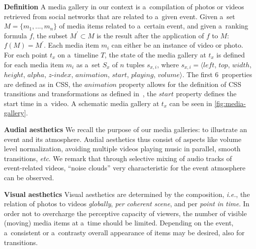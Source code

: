 \noindent \textbf{Definition}
A media gallery in our context is a~compilation of photos or videos
retrieved from social networks that are related to a~given event.
Given a~set $M = \{m_1,..., m_n\}$ of media items related to a~certain event,
and given a~ranking formula $f$,
the subset $M^\prime \subset M$
is the result after the application of $f$ to $M$: $f(M)=M^\prime$.
Each media item $m_i$ can either be an instance of video or photo.
For each point $t_x$ on a~timeline $T$, the state of the media gallery
at $t_x$ is defined for each media item $m_i$
as a~set $S_x$ of $n$ tuples $s_{x,i}$, where
$s_{x,i}=\langle \mathit{left}$, $\mathit{top}$, $\mathit{width}$, $\mathit{height}$,
$\mathit{alpha}$, $\mathit{z\mbox{-}index}$, $\mathit{animation}$,
$\mathit{start}$, $\mathit{playing}$, $\mathit{volume} \rangle$.
The first 6~properties are defined as in CSS, the $\mathit{animation}$ property
allows for the definition of CSS transitions
and transformations as defined in~\cite{CSSTransitions2009,CSSTransforms2012},
the $\mathit{start}$ property defines the start time in a~video.
A schematic media gallery at $t_x$ can be seen in \autoref{fig:media-gallery}.

\noindent \textbf{Audial aesthetics}
We recall the purpose of our media galleries:
to illustrate an event and its atmosphere.
Audial aesthetics thus consist of aspects like volume level normalization,
avoiding multiple videos playing music in parallel, smooth transitions, \emph{etc}.
We remark that through selective mixing of audio tracks
of event-related videos, ``noise clouds'' very characteristic
for the event atmosphere can be observed.

\noindent \textbf{Visual aesthetics}
Visual aesthetics are determined by the composition, \emph{i.e.},
the relation of photos to videos \emph{globally}, \emph{per coherent scene},
and per \emph{point in time}.
In order not to overcharge the perceptive capacity
of viewers, the number of visible (moving) media items
at a~time should be limited.
Depending on the event, a~consistent or a~contrasty overall
appearance of items may be desired, also for transitions.

